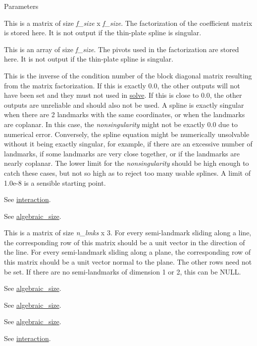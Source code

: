 \begin{DoxyParams}{Parameters}
\item[\mbox{\tt[out]} {\em F}]This is a matrix of size {\itshape f\_\-size\/} x {\itshape f\_\-size\/}. The factorization of the coefficient matrix is stored here. It is not output if the thin-\/plate spline is singular. \item[\mbox{\tt[out]} {\em pivots}]This is an array of size {\itshape f\_\-size\/}. The pivots used in the factorization are stored here. It is not output if the thin-\/plate spline is singular. \item[\mbox{\tt[out]} {\em nonsingularity}]This is the inverse of the condition number of the block diagonal matrix resulting from the matrix factorization. If this is exactly 0.0, the other outputs will not have been set and they must not used in \hyperlink{classew_1_1Tps3_acf2ff420aa319fa03e4ae0efbdbb420a}{solve}. If this is close to 0.0, the other outputs are unreliable and should also not be used. A spline is exactly singular when there are 2 landmarks with the same coordinates, or when the landmarks are coplanar. In this case, the {\itshape nonsingularity\/} might not be exactly 0.0 due to numerical error. Conversely, the spline equation might be numerically unsolvable without it being exactly singular, for example, if there are an excessive number of landmarks, if some landmarks are very close together, or if the landmarks are nearly coplanar. The lower limit for the {\itshape nonsingularity\/} should be high enough to catch these cases, but not so high as to reject too many usable splines. A limit of {\ttfamily 1.0e-\/8} is a sensible starting point. \item[\mbox{\tt[in]} {\em L}]See \hyperlink{classew_1_1Tps3_add5597fd0edb1437c9694d765c507aff}{interaction}. \item[\mbox{\tt[in]} {\em relax\_\-dims\_\-opt}]See \hyperlink{classew_1_1Tps3_a11e70148259244e2c975dabd72ceb28c}{algebraic\_\-size}. \item[\mbox{\tt[in]} {\em relax\_\-params\_\-opt}]This is a matrix of size {\itshape n\_\-lmks\/} x 3. For every semi-\/landmark sliding along a line, the corresponding row of this matrix should be a unit vector in the direction of the line. For every semi-\/landmark sliding along a plane, the corresponding row of this matrix should be a unit vector normal to the plane. The other rows need not be set. If there are no semi-\/landmarks of dimension 1 or 2, this can be {\ttfamily NULL}. \item[\mbox{\tt[in]} {\em f\_\-size}]See \hyperlink{classew_1_1Tps3_a11e70148259244e2c975dabd72ceb28c}{algebraic\_\-size}. \item[\mbox{\tt[in]} {\em is\_\-mixed}]See \hyperlink{classew_1_1Tps3_a11e70148259244e2c975dabd72ceb28c}{algebraic\_\-size}. \item[\mbox{\tt[in]} {\em is\_\-reduced}]See \hyperlink{classew_1_1Tps3_a11e70148259244e2c975dabd72ceb28c}{algebraic\_\-size}. \item[\mbox{\tt[in]} {\em n\_\-lmks}]See \hyperlink{classew_1_1Tps3_add5597fd0edb1437c9694d765c507aff}{interaction}. \end{DoxyParams}

